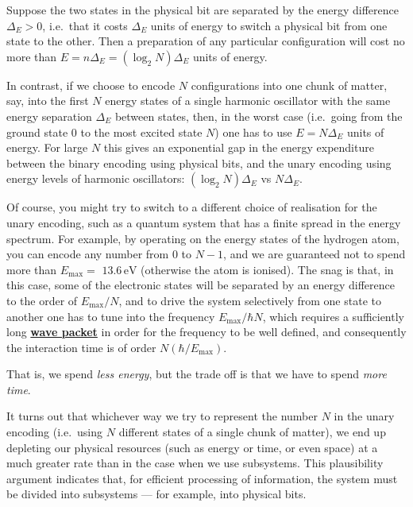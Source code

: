 \documentclass[fleqn]{article}
\renewcommand{\footnote}[1]{\en{#1}}
\begin{document}
Suppose the two states in the physical bit are separated by the energy difference \(\Delta_E>0\), i.e.~that it costs \(\Delta_E\) units of energy to switch a physical bit from one state to the other.
Then a preparation of any particular configuration will cost no more than \(E=n \Delta_E=(\log_2 N)\Delta_E\) units of energy.\footnote{For simplicity here, we're assuming that \(N=2^n\).}

In contrast, if we choose to encode \(N\) configurations into one chunk of matter, say, into the first \(N\) energy states of a single harmonic oscillator with the same energy separation \(\Delta_E\) between states, then, in the worst case (i.e.~going from the ground state \(0\) to the most excited state \(N\)) one has to use \(E=N\Delta_E\) units of energy.
For large \(N\) this gives an exponential gap in the energy expenditure between the binary encoding using physical bits, and the unary encoding using energy levels of harmonic oscillators: \((\log_2 N)\Delta_E\) vs \(N\Delta_E\).

Of course, you might try to switch to a different choice of realisation for the unary encoding, such as a quantum system that has a finite spread in the energy spectrum.
For example, by operating on the energy states of the hydrogen atom, you can encode any number from \(0\) to \(N-1\), and we are guaranteed not to spend more than \(E_{\mathrm{max}}=\) \(13.6\,\mathrm{eV}\) (otherwise the atom is ionised).
The snag is that, in this case, some of the electronic states will be separated by an energy difference to the order of \(E_{\mathrm{max}}/N\), and to drive the system selectively from one state to another one has to tune into the frequency \(E_{\mathrm{max}}/\hbar N\), which requires a sufficiently long \href{https://en.wikipedia.org/wiki/Wave_packet}{\textbf{wave packet}} in order for the frequency to be well defined, and consequently the
interaction time is of order \(N(\hbar/E_{\mathrm{max}})\).

That is, we spend \emph{less energy}, but the trade off is that we have to spend \emph{more time}.

It turns out that whichever way we try to represent the number \(N\) in the unary encoding (i.e.~using \(N\) different states of a single chunk of matter), we end up depleting our physical resources (such as energy or time, or even space) at a much greater rate than in the case when we use subsystems.
This plausibility argument indicates that, for efficient processing of information, the system must be divided into subsystems --- for example, into physical bits.
\end{document}
